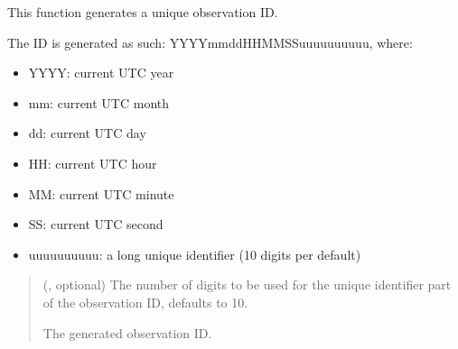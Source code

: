 \documentclass[letterpaper,10pt,english]{sphinxmanual}
\begin{document}

\begin{fulllineitems}
\label{\detokenize{autoapi/aop/aop/index:aop.aop.generate_observation_id}}
\pysigstartsignatures
{}
\pysigstopsignatures
\sphinxAtStartPar
This function generates a unique observation ID.

\sphinxAtStartPar
The ID is generated as such: YYYY\sphinxhyphen{}mm\sphinxhyphen{}dd\sphinxhyphen{}HH\sphinxhyphen{}MM\sphinxhyphen{}SS\sphinxhyphen{}uuuuuuuuuu,
where:
\begin{itemize}
\item {} 
\sphinxAtStartPar
YYYY: current UTC year

\item {} 
\sphinxAtStartPar
mm: current UTC month

\item {} 
\sphinxAtStartPar
dd: current UTC day

\item {} 
\sphinxAtStartPar
HH: current UTC hour

\item {} 
\sphinxAtStartPar
MM: current UTC minute

\item {} 
\sphinxAtStartPar
SS: current UTC second

\item {} 
\sphinxAtStartPar
uuuuuuuuuu: a \sphinxhyphen{}long unique identifier (10 digits per default)

\end{itemize}
\begin{quote}\begin{description}
\sphinxAtStartPar
{} (, optional) \textendash{} The number of digits to be used for the unique identifier part of
the observation ID, defaults to 10.

\sphinxAtStartPar
The generated observation ID.

\sphinxAtStartPar
{}

\end{description}\end{quote}

\end{fulllineitems}
\end{document}
